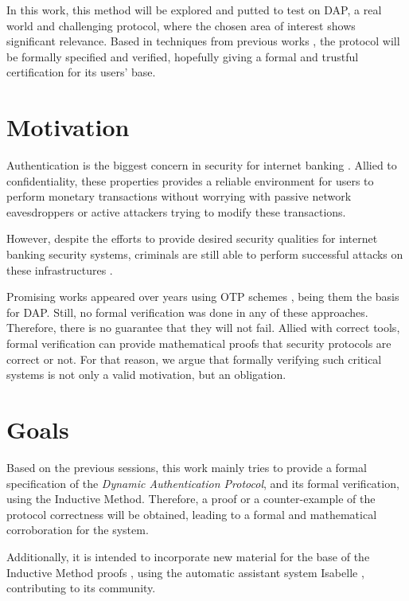 In this work, this method will be explored and putted to test on DAP, a real world and challenging protocol, where the chosen area of interest shows significant relevance. Based in techniques from previous works \cite{BellaPaulson2006, Paulson99, Paulson98}, the protocol will be formally specified and verified, hopefully giving a formal and trustful certification for its users' base.





\section{Motivation}
Authentication is the biggest concern in security for internet banking \cite{Hutchinson2003}. Allied to confidentiality, these properties provides a reliable environment for users to perform monetary transactions without worrying with passive network eavesdroppers or active attackers trying to modify these transactions.

However, despite the efforts to provide desired security qualities for internet banking security systems, criminals are still able to perform successful attacks on these infrastructures \cite{Adham2013}.

Promising works appeared over years using OTP schemes \cite{Starnberger2009, LeeHyunLim2010}, being them the basis for DAP. Still, no formal verification was done in any of these approaches. Therefore, there is no guarantee that they will not fail. Allied with correct tools, formal verification can provide mathematical proofs that security protocols are correct or not. For that reason, we argue that formally verifying such critical systems is not only a valid motivation, but an obligation.




\section{Goals}
Based on the previous sessions, this work mainly tries to provide a formal specification of the \textit{Dynamic Authentication Protocol}, and its formal verification, using the Inductive Method. Therefore, a proof or a counter-example of the protocol correctness will be obtained, leading to a formal and mathematical corroboration for the system.

Additionally, it is intended to incorporate new material for the base of the Inductive Method proofs \cite{isabelle-hol-auth}, using the automatic assistant system Isabelle \cite{isabelle}, contributing to its community.

